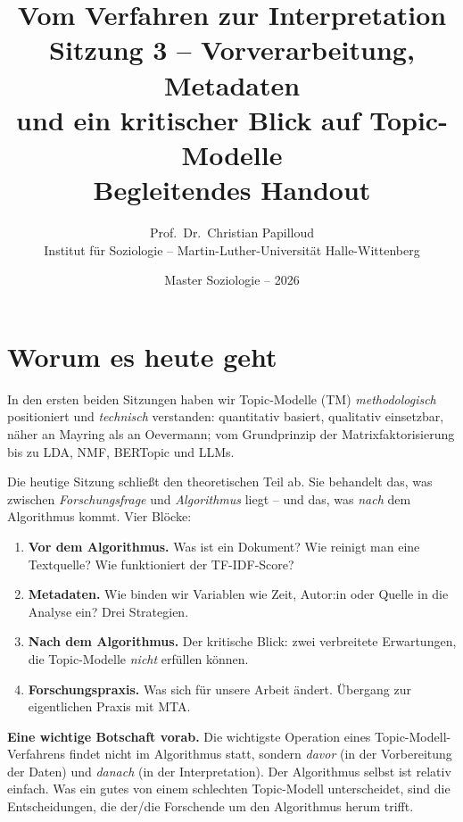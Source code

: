\documentclass[a4paper,11pt]{article}
\title{\textbf{Vom Verfahren zur Interpretation}\\[4pt]
\large Sitzung 3 -- Vorverarbeitung, Metadaten\\und ein kritischer Blick auf Topic-Modelle\\[8pt]
\normalsize Begleitendes Handout}
\author{Prof.\ Dr.\ Christian Papilloud\\
\small Institut für Soziologie -- Martin-Luther-Universität Halle-Wittenberg}
\date{Master Soziologie -- 2026}
\begin{document}
\maketitle
\thispagestyle{fancy}

\vspace{-1em}

\section{Worum es heute geht}

In den ersten beiden Sitzungen haben wir Topic-Modelle (TM)
\emph{methodologisch} positioniert und \emph{technisch} verstanden:
quantitativ basiert, qualitativ einsetzbar, näher an Mayring als an
Oevermann; vom Grundprinzip der Matrixfaktorisierung bis zu LDA, NMF,
BERTopic und LLMs.

Die heutige Sitzung schließt den theoretischen Teil ab. Sie behandelt
das, was zwischen \emph{Forschungsfrage} und \emph{Algorithmus} liegt --
und das, was \emph{nach} dem Algorithmus kommt. Vier Blöcke:

\begin{enumerate}
\item \textbf{Vor dem Algorithmus.} Was ist ein Dokument? Wie reinigt
man eine Textquelle? Wie funktioniert der TF-IDF-Score?
\item \textbf{Metadaten.} Wie binden wir Variablen wie Zeit, Autor:in
oder Quelle in die Analyse ein? Drei Strategien.
\item \textbf{Nach dem Algorithmus.} Der kritische Blick: zwei
verbreitete Erwartungen, die Topic-Modelle \emph{nicht} erfüllen
können.
\item \textbf{Forschungspraxis.} Was sich für unsere Arbeit ändert.
Übergang zur eigentlichen Praxis mit MTA.
\end{enumerate}

\begin{merkbox}
\textbf{Eine wichtige Botschaft vorab.} Die wichtigste Operation eines
Topic-Modell-Verfahrens findet nicht im Algorithmus statt, sondern
\emph{davor} (in der Vorbereitung der Daten) und \emph{danach} (in der
Interpretation). Der Algorithmus selbst ist relativ einfach. Was ein
gutes von einem schlechten Topic-Modell unterscheidet, sind die
Entscheidungen, die der/die Forschende um den Algorithmus herum trifft.
\end{merkbox}

\end{document}
